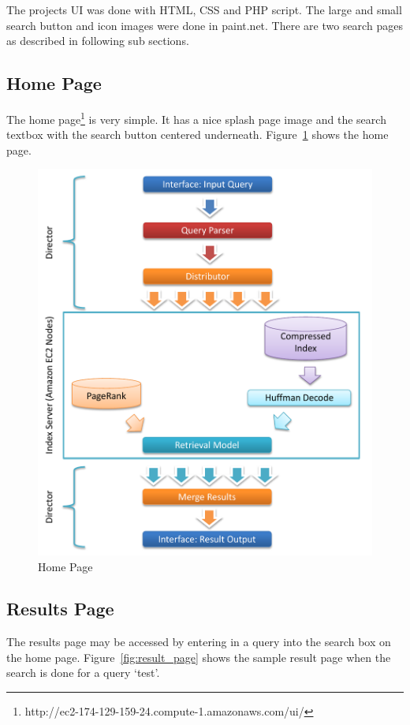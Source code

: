 \documentclass[letterpaper,11pt,twoside]{article}
\begin{document}
The projects UI was done with HTML, CSS and PHP script. The large and small search button and icon images were done in paint.net. There are two search pages as described in following sub sections. 

\subsection{Home Page}
The home page\footnote{http://ec2-174-129-159-24.compute-1.amazonaws.com/ui/} is very simple. It has a nice splash page image and the search textbox with the search button centered underneath. Figure~\ref{fig:home_page} shows the home page.

\begin{figure}[htbp]
 \centering
 \includegraphics[trim=0.0in 5.35in 0.0in 0.0in, clip, page=2]{Architecture.pdf}
 \caption{Home Page}
 \label{fig:home_page}
\end{figure}

\subsection{Results Page} 
The results page may be accessed by entering in a query into the search box on the home page. Figure~\ref{fig:result_page} shows the sample result page when the search is done for a query `test'.
\end{document}
